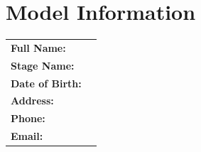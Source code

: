 
\section{Model Information}
\label{sec:model}

\noindent
\begin{tabular}{p{6cm} p{10cm}}
\textbf{Full Name:} & \ModelName{} \\ 
\textbf{Stage Name:} & \ModelStageName{} \\ 
\textbf{Date of Birth:} & \ModelBirthday{} \\ 
\textbf{Address:} & \ModelAddress{}\\ 
\textbf{Phone:} & \ModelPhone{}\\ 
\textbf{Email:} & \ModelEmail{}\\ 
\end{tabular}

\vspace*{0.2cm}

